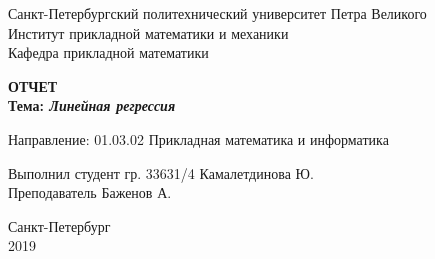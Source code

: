 \begin{titlepage}

\begin{center}
Санкт-Петербургский политехнический университет Петра Великого\\
Институт прикладной математики и механики\\
Кафедра прикладной математики\\
\end{center}


\vspace{2.5cm}

\begin{center}
{\large {\bfseries ОТЧЕТ}}\\

\bigskip \bfseries{Тема:} {\bfseries \emph{Линейная регрессия}}
\end{center}

\vspace{1.5cm}

\begin{flushleft}
Направление: 01.03.02 Прикладная математика и информатика

\vspace{1.5cm}

Выполнил студент гр. 33631/4 \hfill{Камалетдинова Ю.} \\ 

\vspace{0.5cm} Преподаватель \hfill{Баженов А.}
\vspace{1cm}

\end{flushleft}

\vspace{2.7cm}

\begin{center}
Санкт-Петербург\\
2019
\end{center}

\end{titlepage}
